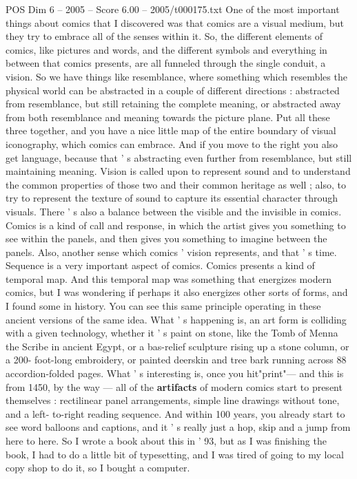 \begin{textsample}{POS Dim 6 – 2005 – Score 6.00 – 2005/t000175.txt}
One of the most important things about comics that I discovered was that comics are a visual medium, but they try to embrace all of the senses within it.
So, the different elements of comics, like pictures and words, and the different symbols and everything in between that comics presents, are all funneled through the single conduit, a vision.
So we have things like resemblance, where something which resembles the physical world can be abstracted in a couple of different directions : abstracted from resemblance, but still retaining the complete meaning, or abstracted away from both resemblance and meaning towards the picture plane.
Put all these three together, and you have a nice little map of the entire boundary of visual iconography, which comics can embrace.
And if you move to the right you also get language, because that ' s abstracting even further from resemblance, but still maintaining meaning.
Vision is called upon to represent sound and to understand the common properties of those two and their common heritage as well ; also, to try to represent the texture of sound to capture its essential character through visuals.
There ' s also a balance between the visible and the invisible in comics.
Comics is a kind of call and response, in which the artist gives you something to see within the panels, and then gives you something to imagine between the panels.
Also, another sense which comics ' vision represents, and that ' s time.
Sequence is a very important aspect of comics.
Comics presents a kind of temporal map.
And this temporal map was something that energizes modern comics, but I was wondering if perhaps it also energizes other sorts of forms, and I found some in history.
You can see this same principle operating in these ancient versions of the same idea.
What ' s happening is, an art form is colliding with a given technology, whether it ' s paint on stone, like the Tomb of Menna the Scribe in ancient Egypt, or a bas-relief sculpture rising up a stone column, or a 200- foot-long embroidery, or painted deerskin and tree bark running across 88 accordion-folded pages.
What ' s interesting is, once you hit"print"— and this is from 1450, by the way — all of the \textbf{artifacts} of modern comics start to present themselves : rectilinear panel arrangements, simple line drawings without tone, and a left- to-right reading sequence.
And within 100 years, you already start to see word balloons and captions, and it ' s really just a hop, skip and a jump from here to here.
So I wrote a book about this in ' 93, but as I was finishing the book, I had to do a little bit of typesetting, and I was tired of going to my local copy shop to do it, so I bought a computer.

\end{textsample}
